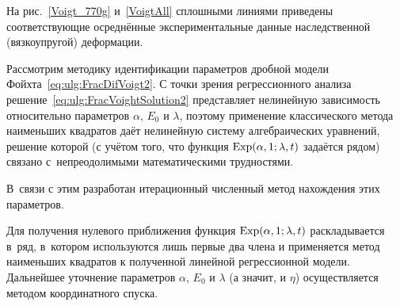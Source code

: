 На рис.~\ref{Voigt_770g} и~\ref{VoigtAll} сплошными линиями приведены соответствующие осреднённые экспериментальные данные наследственной (вязкоупругой) деформации.



Рассмотрим методику идентификации параметров дробной модели Фойхта~\eqref{eq:ulg:FracDifVoigt2}. С точки зрения регрессионного анализа решение~\eqref{eq:ulg:FracVoightSolution2} представляет нелинейную зависимость относительно параметров $\alpha$, $E_{0}$ и $\lambda$, поэтому применение классического метода наименьших квадратов даёт нелинейную систему алгебраических уравнений, решение которой (с учётом того, что функция $  \mathop{\rm Exp}\nolimits  (\alpha, 1;\lambda,t)$ задаётся рядом) связано с~непреодолимыми математическими трудностями. 

В~связи с этим разработан итерационный численный метод нахождения этих параметров. 



Для получения нулевого приближения функция $  \mathop{\rm Exp}\nolimits  (\alpha, 1;\lambda,t)$ раскладывается в~ряд, в~котором используются лишь первые два члена и применяется метод наименьших квадратов к полученной линейной регрессионной модели. Дальнейшее уточнение параметров $\alpha$, $E_{0}$ и $\lambda$ (а значит, и $\eta$) осуществляется методом координатного спуска.



